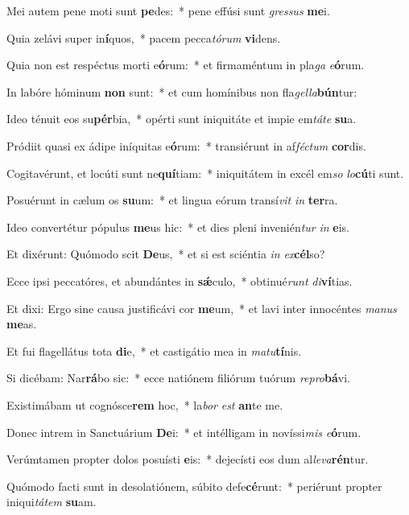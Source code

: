 \item Mei autem pene moti sunt \textbf{pe}des:~* pene effúsi sunt \textit{gressus} \textbf{me}i.
\item Quia zelávi super in\textbf{í}quos,~* pacem pecca\hspace{0.04em}\textit{tórum} \textbf{vi}dens.
\item Quia non est respéctus morti e\textbf{ó}rum:~* et firmaméntum in pla\textit{ga} \textit{e}\textbf{ó}rum.
\item In labóre hóminum \textbf{non} sunt:~* et cum homínibus non fla\textit{gella}\textbf{bún}tur:
\item Ideo ténuit eos su\textbf{pér}bia,~* opérti sunt iniquitáte et impie em\textit{táte} \textbf{su}a.
\item Pródiit quasi ex ádipe iníquitas e\textbf{ó}rum:~* transiérunt in af\textit{féctum} \textbf{cor}dis.
\item Cogitavérunt, et locúti sunt ne\textbf{quí}tiam:~* iniquitátem in excél em\textit{so} \textit{lo}\textbf{cú}ti sunt.
\item Posuérunt in cælum os \textbf{su}um:~* et lingua eórum transí\textit{vit} \textit{in} \textbf{ter}ra.
\item Ideo convertétur pópulus \textbf{me}us hic:~* et dies pleni invenién\textit{tur} \textit{in} \textbf{e}is.
\item Et dixérunt: Quómodo scit \textbf{De}us,~* et si est sciéntia \textit{in} \textit{ex}\textbf{cél}so?
\item Ecce ipsi peccatóres, et abundántes in \textbf{sǽ}culo,~* obtinué\textit{runt} \textit{di}\textbf{ví}tias.
\item Et dixi: Ergo sine causa justificávi cor \textbf{me}um,~* et lavi inter innocéntes \textit{manus} \textbf{me}as.
\item Et fui flagellátus tota \textbf{di}e,~* et castigátio mea in \textit{matu}\textbf{tí}nis.
\item Si dicébam: Nar\textbf{rá}bo sic:~* ecce natiónem filiórum tuórum \textit{repro}\textbf{bá}vi.
\item Existimábam ut cognósce\textbf{rem} hoc,~* la\textit{bor} \textit{est} \textbf{an}te me.
\item Donec intrem in Sanctuárium \textbf{De}i:~* et intélligam in novíssi\textit{mis} \textit{e}\textbf{ó}rum.
\item Verúmtamen propter dolos posuísti \textbf{e}is:~* dejecísti eos dum al\textit{leva}\textbf{rén}tur.
\item Quómodo facti sunt in desolatiónem, súbito defe\textbf{cé}runt:~* periérunt propter iniqui\textit{tátem} \textbf{su}am.
